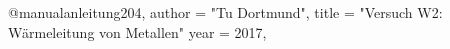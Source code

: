 @manual{anleitung204,
author = "Tu Dortmund",
title = "Versuch W2: Wärmeleitung von Metallen"
year = 2017,
}